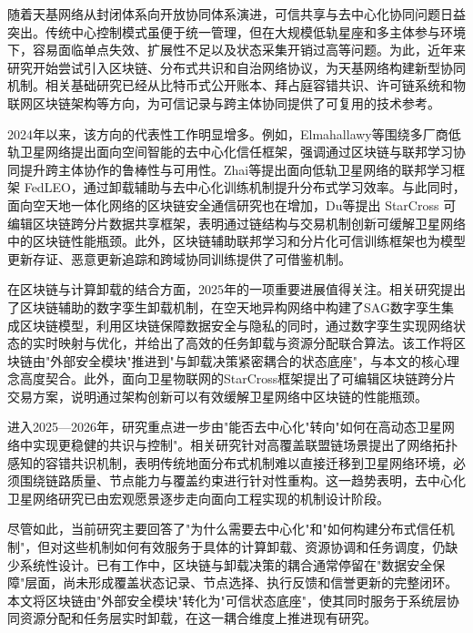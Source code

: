 随着天基网络从封闭体系向开放协同体系演进，可信共享与去中心化协同问题日益突出。传统中心控制模式虽便于统一管理，但在大规模低轨星座和多主体参与环境下，容易面临单点失效、扩展性不足以及状态采集开销过高等问题。为此，近年来研究开始尝试引入区块链、分布式共识和自治网络协议，为天基网络构建新型协同机制。相关基础研究已经从比特币式公开账本、拜占庭容错共识、许可链系统和物联网区块链架构等方向，为可信记录与跨主体协同提供了可复用的技术参考\cite{ref3,Lamport1982Byzantine,Castro1999,Androulaki2018Fabric,ref12,ref13,ref15}。

2024年以来，该方向的代表性工作明显增多。例如，Elmahallawy等围绕多厂商低轨卫星网络提出面向空间智能的去中心化信任框架，强调通过区块链与联邦学习协同提升跨主体协作的鲁棒性与可用性\cite{Elmahallawy2025}。Zhai等提出面向低轨卫星网络的联邦学习框架 FedLEO，通过卸载辅助与去中心化训练机制提升分布式学习效率\cite{ref30}。与此同时，面向空天地一体化网络的区块链安全通信研究也在增加，Du等提出 StarCross 可编辑区块链跨分片数据共享框架，表明通过链结构与交易机制创新可缓解卫星网络中的区块链性能瓶颈\cite{ref28}。此外，区块链辅助联邦学习和分片化可信训练框架也为模型更新存证、恶意更新追踪和跨域协同训练提供了可借鉴机制\cite{Feng2022,ref29,ETSI2024BCFL}。

在区块链与计算卸载的结合方面，2025年的一项重要进展值得关注。相关研究提出了区块链辅助的数字孪生卸载机制，在空天地异构网络中构建了SAG数字孪生集成区块链模型，利用区块链保障数据安全与隐私的同时，通过数字孪生实现网络状态的实时映射与优化，并给出了高效的任务卸载与资源分配联合算法\cite{ref27}。该工作将区块链由"外部安全模块"推进到"与卸载决策紧密耦合的状态底座"，与本文的核心理念高度契合。此外，面向卫星物联网的StarCross框架提出了可编辑区块链跨分片交易方案，说明通过架构创新可以有效缓解卫星网络中区块链的性能瓶颈\cite{ref28}。

进入2025—2026年，研究重点进一步由"能否去中心化"转向"如何在高动态卫星网络中实现更稳健的共识与控制"。相关研究针对高覆盖联盟链场景提出了网络拓扑感知的容错共识机制，表明传统地面分布式机制难以直接迁移到卫星网络环境，必须围绕链路质量、节点能力与覆盖约束进行针对性重构\cite{NetTopoBFT2025}。这一趋势表明，去中心化卫星网络研究已由宏观愿景逐步走向面向工程实现的机制设计阶段。

尽管如此，当前研究主要回答了"为什么需要去中心化"和"如何构建分布式信任机制"，但对这些机制如何有效服务于具体的计算卸载、资源协调和任务调度，仍缺少系统性设计。已有工作中，区块链与卸载决策的耦合通常停留在"数据安全保障"层面，尚未形成覆盖状态记录、节点选择、执行反馈和信誉更新的完整闭环。本文将区块链由"外部安全模块"转化为"可信状态底座"，使其同时服务于系统层协同资源分配和任务层实时卸载，在这一耦合维度上推进现有研究。

